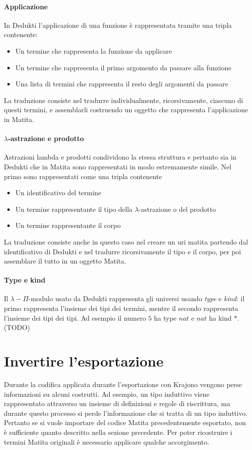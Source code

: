 \documentclass[12pt,a4paper]{mimosis}
\begin{document}
\paragraph{Applicazione}
In Dedukti l'applicazione di una funzione è rappresentata tramite una tripla
contenente: 
\begin{itemize}
  \item Un termine che rappresenta la funzione da applicare
  \item Un termine che rappresenta il primo argomento da passare alla funzione
  \item Una lista di termini che rappresenta il resto degli argomenti da passare
\end{itemize}

La traduzione consiste nel tradurre individualmente, ricorsivamente, ciascuno
di questi termini, e assemblarli costruendo un oggetto che rappresenta l'applicazione
in Matita. 

\paragraph{$\lambda$-astrazione e prodotto}
Astrazioni lambda e prodotti condividono la stessa struttura e pertanto sia in Dedukti
che in Matita sono rappresentati in modo estremamente simile.
Nel primo sono rappresentati come una tripla contenente
\begin{itemize}
  \item Un identificativo del termine
  \item Un termine rappresentante il tipo della $\lambda$-astrazione o del prodotto
  \item Un termine rappresentante il corpo
\end{itemize}
La traduzione consiste anche in questo caso nel creare un uri matita partendo dal
identificativo di Dedukti e nel tradurre ricorsivamente il tipo e il corpo, per
poi assemblare il tutto in un oggetto Matita.

\paragraph{Type e kind}
Il $\lambda-\Pi$-modulo usato da Dedukti rappresenta gli universi usando
\textit{type} e \textit{kind}: il primo rappresenta l'insieme dei tipi
dei termini, mentre il secondo rappresenta l'insieme dei tipi dei tipi.
Ad esempio il numero $5$ ha type $nat$ e $nat$ ha kind $*$.  (TODO)

\section{Invertire l'esportazione}
Durante la codifica applicata durante l'esportazione con Krajono vengono perse
informazioni su alcuni costrutti. Ad esempio, un tipo induttivo viene rappresentato
attraverso un insieme di definizioni e regole di riscrittura, ma durante questo processo
si perde l'informazione che si tratta di un tipo induttivo. Pertanto se si vuole 
importare del codice Matita precedentemente esportato, non è sufficiente quanto descritto
nella sezione precedente. Per poter ricostruire i termini Matita originali è necessario
applicare qualche accorgimento.
\end{document}
